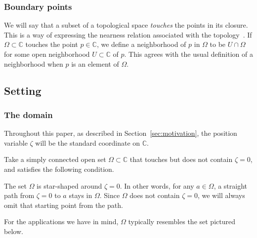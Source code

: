 \documentclass{article}
\makeatletter
\theoremstyle{definition}
\theoremstyle{plain}
\newcommand{\cond}[1]{\item[(\textsc{#1})]\protected@edef\@currentlabel{\textsc{#1}}}
\newcommand{\C}{\mathbb{C}}
\newcommand{\domain}{\Omega}
\makeatother
\begin{document}
\subsubsection{Boundary points}
We will say that a subset of a topological space {\em touches} the points in its closure. This is a way of expressing the nearness relation associated with the topology~\cite[Chapter~5, Definition~2.11]{joshi1983gen-top}. If $\Omega \subset \C$ touches the point $p \in \C$, we define a neighborhood of $p$ in $\Omega$ to be $U \cap \Omega$ for some open neighborhood $U \subset \C$ of $p$. This agrees with the usual definition of a neighborhood when $p$ is an element of $\Omega$.
\subsection{Setting}\label{setting}
\subsubsection{The domain}\label{setting:domain}
Throughout this paper, as described in Section~\ref{sec:motivation}, the position variable $\zeta$ will be the standard coordinate on $\C$. 

Take a simply connected open set $\domain \subset \C$ that touches but does not contain $\zeta = 0$, and satisfies the following condition.
\begin{conditions}
\cond{star}\label{cond:star} The set $\domain$ is star-shaped around $\zeta = 0$. In other words, for any $a \in \domain$, a straight path from $\zeta = 0$ to $a$ stays in $\domain$. Since $\domain$ does not contain $\zeta = 0$, we will always omit that starting point from the path.
\end{conditions}
For the applications we have in mind, $\domain$ typically resembles the set pictured below.
\vspace{2mm}

\begin{center}
\end{center}
\end{document}
